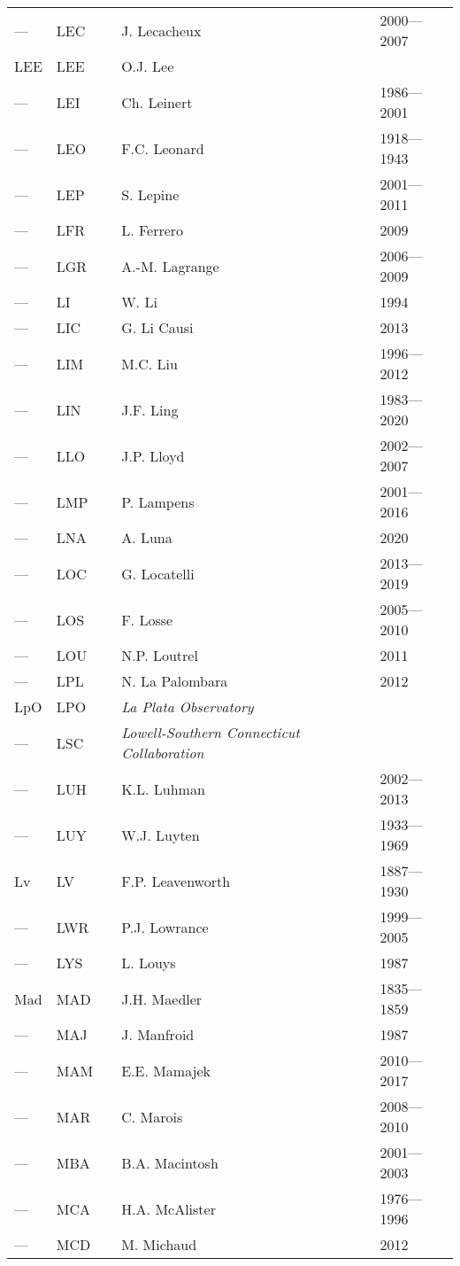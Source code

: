 \begin{longtable}{l|l|c|p{59mm}|l}
--- & LEC &   & J. Lecacheux & 2000---2007 \\
LEE & LEE &   & O.J. Lee & \\
--- & LEI &   & Ch. Leinert & 1986---2001 \\
--- & LEO &   & F.C. Leonard & 1918---1943 \\
--- & LEP &   & S. Lepine & 2001---2011 \\
--- & LFR &   & L. Ferrero & 2009 \\
--- & LGR &   & A.-M. Lagrange & 2006---2009 \\
--- & LI  &   & W. Li & 1994 \\
--- & LIC &   & G. Li Causi & 2013 \\
--- & LIM &   & M.C. Liu & 1996---2012 \\
--- & LIN &   & J.F. Ling & 1983---2020 \\
--- & LLO &   & J.P. Lloyd & 2002---2007 \\
--- & LMP &   & P. Lampens & 2001---2016 \\
--- & LNA &   & A. Luna & 2020 \\
--- & LOC &   & G. Locatelli & 2013---2019 \\
--- & LOS &   & F. Losse & 2005---2010 \\
--- & LOU &   & N.P. Loutrel & 2011 \\
--- & LPL &   & N. La Palombara & 2012 \\
LpO & LPO &   & \emph{La Plata Observatory} & \\
--- & LSC &   & \emph{Lowell-Southern Connecticut Collaboration} & \\
--- & LUH &   & K.L. Luhman & 2002---2013 \\
--- & LUY &   & W.J. Luyten & 1933---1969 \\
Lv  & LV  &   & F.P. Leavenworth & 1887---1930 \\
--- & LWR &   & P.J. Lowrance & 1999---2005 \\
--- & LYS &   & L. Louys & 1987 \\\midrule
Mad & MAD &   & J.H. Maedler & 1835---1859 \\
--- & MAJ &   & J. Manfroid & 1987 \\
--- & MAM &   & E.E. Mamajek & 2010---2017 \\
--- & MAR &   & C. Marois & 2008---2010 \\
--- & MBA &   & B.A. Macintosh & 2001---2003 \\
--- & MCA &   & H.A. McAlister & 1976---1996 \\
--- & MCD &   & M. Michaud & 2012 \\

\end{longtable}
